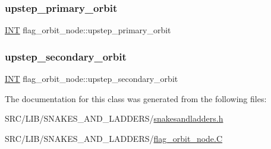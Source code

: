 \subsubsection{\texorpdfstring{upstep\+\_\+primary\+\_\+orbit}{upstep\_primary\_orbit}}
{\footnotesize\ttfamily \mbox{\hyperlink{galois_8h_a09fddde158a3a20bd2dcadb609de11dc}{I\+NT}} flag\+\_\+orbit\+\_\+node\+::upstep\+\_\+primary\+\_\+orbit}

\mbox{\label{classflag__orbit__node_a2b0fd8872adb66ff81efb522d9d3f22e}} 
\subsubsection{\texorpdfstring{upstep\+\_\+secondary\+\_\+orbit}{upstep\_secondary\_orbit}}
{\footnotesize\ttfamily \mbox{\hyperlink{galois_8h_a09fddde158a3a20bd2dcadb609de11dc}{I\+NT}} flag\+\_\+orbit\+\_\+node\+::upstep\+\_\+secondary\+\_\+orbit}



The documentation for this class was generated from the following files\+:\begin{DoxyCompactItemize}
\item 
S\+R\+C/\+L\+I\+B/\+S\+N\+A\+K\+E\+S\+\_\+\+A\+N\+D\+\_\+\+L\+A\+D\+D\+E\+R\+S/\mbox{\hyperlink{snakesandladders_8h}{snakesandladders.\+h}}\item 
S\+R\+C/\+L\+I\+B/\+S\+N\+A\+K\+E\+S\+\_\+\+A\+N\+D\+\_\+\+L\+A\+D\+D\+E\+R\+S/\mbox{\hyperlink{flag__orbit__node_8_c}{flag\+\_\+orbit\+\_\+node.\+C}}\end{DoxyCompactItemize}
